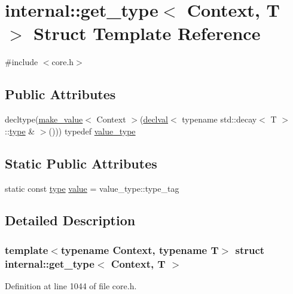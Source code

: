 \hypertarget{structinternal_1_1get__type}{}\section{internal\+:\+:get\+\_\+type$<$ Context, T $>$ Struct Template Reference}
\label{structinternal_1_1get__type}


{\ttfamily \#include $<$core.\+h$>$}

\subsection*{Public Attributes}
\begin{DoxyCompactItemize}
\item 
decltype(\hyperlink{namespaceinternal_a8db45bc77a419c9cb588d3418671c6fd}{make\+\_\+value}$<$ Context $>$(\hyperlink{namespaceinternal_a5f61aadb1d6afc8b79ef7ea57c39eafc}{declval}$<$ typename std\+::decay$<$ T $>$\+::\hyperlink{namespaceinternal_a8661864098ac0acff9a6dd7e66f59038}{type} \& $>$())) typedef \hyperlink{structinternal_1_1get__type_a3ad8a0402931621b6c86815d463c4b3f}{value\+\_\+type}
\end{DoxyCompactItemize}
\subsection*{Static Public Attributes}
\begin{DoxyCompactItemize}
\item 
static const \hyperlink{namespaceinternal_a8661864098ac0acff9a6dd7e66f59038}{type} \hyperlink{structinternal_1_1get__type_ae806466c3a38f663a770869b8608749a}{value} = value\+\_\+type\+::type\+\_\+tag
\end{DoxyCompactItemize}


\subsection{Detailed Description}
\subsubsection*{template$<$typename Context, typename T$>$\newline
struct internal\+::get\+\_\+type$<$ Context, T $>$}



Definition at line 1044 of file core.\+h.



